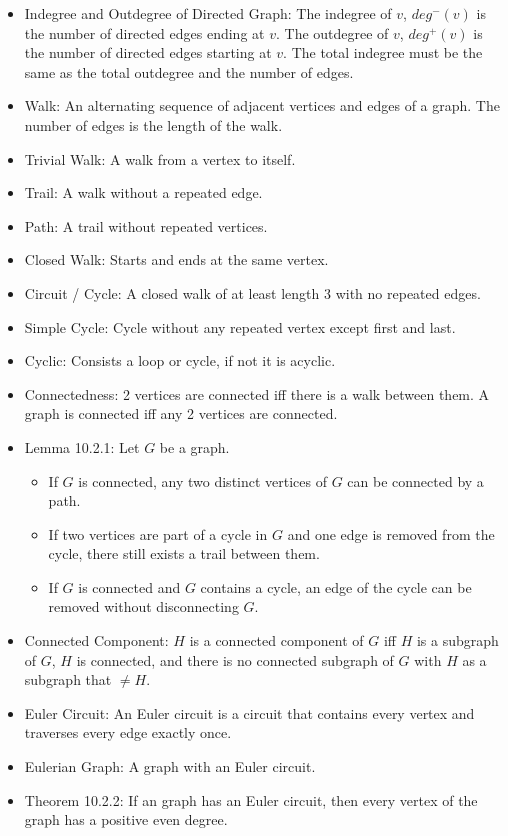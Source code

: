 \documentclass[10pt, portrait]{article}
\begin{document}
\begin{multicols*}{2}
\begin{itemize}
    \item Indegree and Outdegree of Directed Graph: The indegree of $v$, $deg^-(v)$ is the number of directed edges ending at $v$. The outdegree of $v$, $deg^+(v)$ is the number of directed edges starting at $v$. The total indegree must be the same as the total outdegree and the number of edges.
    \item Walk: An alternating sequence of adjacent vertices and edges of a graph. The number of edges is the length of the walk.
    \item Trivial Walk: A walk from a vertex to itself.
    \item Trail: A walk without a repeated edge.
    \item Path: A trail without repeated vertices.
    \item Closed Walk: Starts and ends at the same vertex.
    \item Circuit / Cycle: A closed walk of at least length 3 with no repeated edges.
    \item Simple Cycle: Cycle without any repeated vertex except first and last.
    \item Cyclic: Consists a loop or cycle, if not it is acyclic.
    \item Connectedness: 2 vertices are connected iff there is a walk between them. A graph is connected iff any 2 vertices are connected.
    \item Lemma 10.2.1: Let $G$ be a graph.
    \begin{itemize}
        \item If $G$ is connected, any two distinct vertices of $G$ can be connected by a path.
        \item If two vertices are part of a cycle in $G$ and one edge is removed from the cycle, there still exists a trail between them.
        \item If $G$ is connected and $G$ contains a cycle, an edge of the cycle can be removed without disconnecting $G$.
    \end{itemize}
    \item Connected Component: $H$ is a connected component of $G$ iff $H$ is a subgraph of $G$, $H$ is connected, and there is no connected subgraph of $G$ with $H$ as a subgraph that $\neq H$.
    \item Euler Circuit: An Euler circuit is a circuit that contains every vertex and traverses every edge exactly once.
    \item Eulerian Graph: A graph with an Euler circuit.
    \item Theorem 10.2.2: If an graph has an Euler circuit, then every vertex of the graph has a positive even degree.

\end{itemize}
\end{multicols*}
\end{document}
